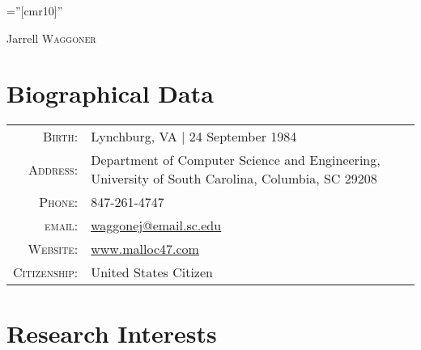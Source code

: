 \documentclass[a4paper,10pt]{article}
\begin{document}

\pagestyle{empty} %

\font\fb=''[cmr10]'' %

\par{\centering
		{\Huge Jarrell \textsc{Waggoner}
	}\bigskip\par}

\section{Biographical Data}

\begin{tabular}{r p{3.5in}}
	\textsc{Birth:} & Lynchburg, VA \hspace{0.5em} | \hspace{0.5em} 24 September 1984 \\
	\textsc{Address:}	& Department of Computer Science and Engineering, University of South Carolina, Columbia, SC 29208 \\
    \textsc{Phone:}     & 847-261-4747\\
    \textsc{email:}     & \href{mailto:waggonej@email.sc.edu}{waggonej@email.sc.edu} \\
	\textsc{Website:}	& \href{http://www.malloc47.com}{www.malloc47.com} \\
	\textsc{Citizenship:} & United States Citizen \\
\end{tabular}

\section{Research Interests}
\end{document}

